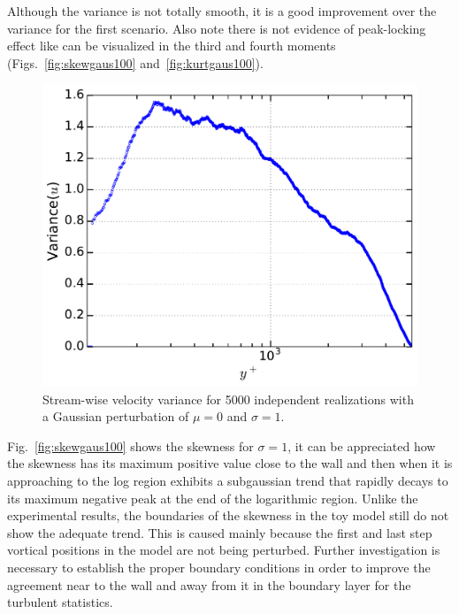 \documentclass[aps,reprint,amsmath,amssymb,pra,floatfix]{revtex4-1}%
\begin{document}
Although the variance is not totally smooth, it is a good improvement over the variance for the first scenario. Also note there is not evidence of peak-locking effect like can be visualized in the third and fourth moments (Figs.~\ref{fig:skewgaus100} and~\ref{fig:kurtgaus100}). 
\begin{figure}[b]
\includegraphics[scale=0.46]{figures/variance_5000_assembles_gauss100}
\caption{\label{fig:varigaus100} Stream-wise velocity variance for 5000 independent realizations with a Gaussian perturbation of $\mu=0$ and $\sigma=1$.}
\end{figure}
Fig.~\ref{fig:skewgaus100} shows the skewness for $\sigma=1$, it can be appreciated how the skewness has its maximum positive value close to the wall and then when it is approaching to the log region exhibits a subgaussian trend that rapidly decays to its maximum negative peak at the end of the logarithmic region. Unlike the experimental results, the boundaries of the skewness in the toy model still do not show the adequate trend. This is caused mainly because the first and last step vortical positions in the model are not being perturbed. Further investigation is necessary to establish the proper boundary conditions in order to improve the agreement near to the wall and away from it in the boundary layer for the turbulent statistics.
\end{document}
